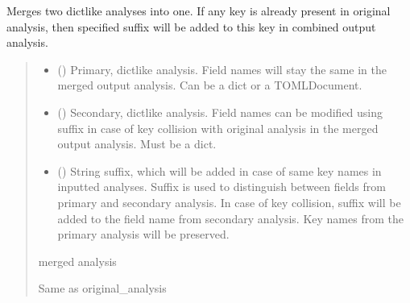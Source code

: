 \documentclass[letterpaper,10pt,english]{sphinxmanual}
\begin{document}
\begin{fulllineitems}
\label{\detokenize{general_utils:general_utils.merge_analyses}}
\pysigstartsignatures
\pysiglinewithargsret
{}
{\sphinxparamcomma {}\sphinxparamcomma {}}
{}
\pysigstopsignatures
\sphinxAtStartPar
Merges two dict\sphinxhyphen{}like analyses into one.
If any key is already present in original analysis, then specified suffix will be added to this key in combined output analysis.
\begin{quote}\begin{description}
\begin{itemize}
\item {} 
\sphinxAtStartPar
{} () \textendash{} Primary, dict\sphinxhyphen{}like analysis.
Field names will stay the same in the merged output analysis.
Can be a dict or a TOMLDocument.

\item {} 
\sphinxAtStartPar
{} () \textendash{} Secondary, dict\sphinxhyphen{}like analysis.
Field names can be modified using suffix in case of key collision with original analysis in the merged output analysis.
Must be a dict.

\item {} 
\sphinxAtStartPar
{} () \textendash{} String suffix, which will be added in case of same key names in inputted analyses.
Suffix is used to distinguish between fields from primary and secondary analysis.
In case of key collision, suffix will be added to the field name from secondary analysis.
Key names from the primary analysis will be preserved.

\end{itemize}

\sphinxAtStartPar
merged analysis

\sphinxAtStartPar
Same as original\_analysis

\end{description}\end{quote}

\end{fulllineitems}
\end{document}
